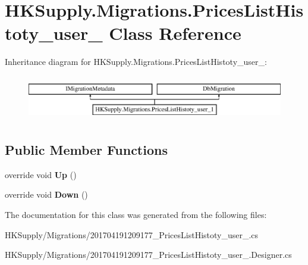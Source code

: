\hypertarget{class_h_k_supply_1_1_migrations_1_1_prices_list_histoty__user__1}{}\section{H\+K\+Supply.\+Migrations.\+Prices\+List\+Histoty\+\_\+user\+\_ Class Reference}
\label{class_h_k_supply_1_1_migrations_1_1_prices_list_histoty__user__1}
Inheritance diagram for H\+K\+Supply.\+Migrations.\+Prices\+List\+Histoty\+\_\+user\+\_\+:\begin{figure}[H]
\begin{center}
\leavevmode
\includegraphics[height=1.985816cm]{class_h_k_supply_1_1_migrations_1_1_prices_list_histoty__user__1}
\end{center}
\end{figure}
\subsection*{Public Member Functions}
\begin{DoxyCompactItemize}
\item 
\mbox{\label{class_h_k_supply_1_1_migrations_1_1_prices_list_histoty__user__1_a18a5d44014dd6175f2b9fa8843c2f32e}} 
override void {\bfseries Up} ()
\item 
\mbox{\label{class_h_k_supply_1_1_migrations_1_1_prices_list_histoty__user__1_a69d350b7ea630f3be0dcbdb41a2db264}} 
override void {\bfseries Down} ()
\end{DoxyCompactItemize}


The documentation for this class was generated from the following files\+:\begin{DoxyCompactItemize}
\item 
H\+K\+Supply/\+Migrations/201704191209177\+\_\+\+Prices\+List\+Histoty\+\_\+user\+\_.\+cs\item 
H\+K\+Supply/\+Migrations/201704191209177\+\_\+\+Prices\+List\+Histoty\+\_\+user\+\_.\+Designer.\+cs\end{DoxyCompactItemize}
